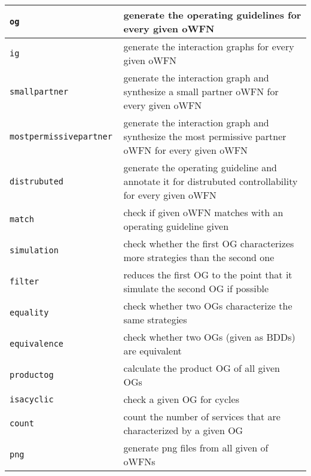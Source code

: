\sf
\begin{longtable}{lp{200pt}}
\hline
\texttt{og	}& generate the operating guidelines for every given oWFN \\
\hline
\texttt{ig	}& generate the interaction graphs for every given oWFN \\
\hline
\texttt{smallpartner }& generate the interaction graph and synthesize a small partner oWFN for every given oWFN \\
\hline
\texttt{mostpermissivepartner 	}& generate the interaction graph and synthesize the most permissive partner oWFN for every given oWFN \\
\hline
\texttt{distrubuted	}& generate the operating guideline and annotate it for distrubuted controllability for every given oWFN \\
\hline
\texttt{match	}& check if given oWFN matches with an operating guideline given \\
\hline
\texttt{simulation }& check whether the first OG characterizes more strategies than the second one \\
\hline
\texttt{filter }& reduces the first OG to the point that it simulate the second OG if possible \\
\hline
\texttt{equality }& check whether two OGs characterize the same strategies \\
\hline
\texttt{equivalence }& check whether two OGs (given as BDDs) are equivalent \\
\hline
\texttt{productog }& calculate the product OG of all given OGs \\
\hline
\texttt{isacyclic }& check a given OG for cycles \\
\hline
\texttt{count }& count the number of services that are characterized by a given OG \\
\hline
\texttt{png }& generate png files from all given of oWFNs \\
\hline
\end{longtable}
\rm
